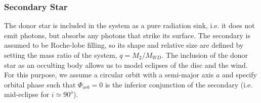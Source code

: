 \subsubsection{Secondary Star}

The donor star is included in the system as a pure radiation sink, 
i.e. it does not emit photons, but absorbs any photons that strike its
surface. The secondary is assumed to be Roche-lobe filling, so its
shape and relative size are defined by setting the mass ratio of the system, 
$q = M_2/M_{WD}$. The inclusion of the donor star as an occulting body
allows us to model eclipses of the disc and the wind. For this
purpose, we assume a circular orbit with a semi-major axis $a$ and 
specify orbital phase such that $\Phi_{orb} = 0$ is the
inferior conjunction of the secondary (i.e. mid-eclipse for $i \simeq
90^o$).




%
%


